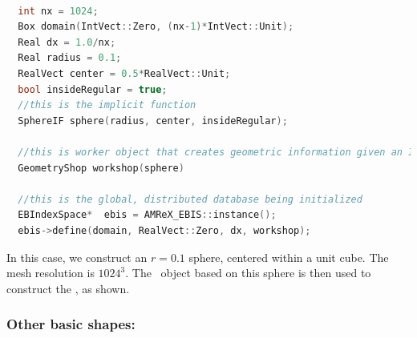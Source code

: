 \begin{lstlisting}[language=cpp]

  int nx = 1024;
  Box domain(IntVect::Zero, (nx-1)*IntVect::Unit);
  Real dx = 1.0/nx;
  Real radius = 0.1;
  RealVect center = 0.5*RealVect::Unit;
  bool insideRegular = true;
  //this is the implicit function
  SphereIF sphere(radius, center, insideRegular);

  //this is worker object that creates geometric information given an IF
  GeometryShop workshop(sphere)

  //this is the global, distributed database being initialized
  EBIndexSpace*  ebis = AMReX_EBIS::instance();
  ebis->define(domain, RealVect::Zero, dx, workshop);

\end{lstlisting}

In this case, we construct an $r=0.1$ sphere, centered within a unit cube.  The mesh resolution is $1024^3$.
The \geom\ object based on this sphere is then used to construct the \ebis, as shown.

\subsubsection{Other basic shapes:}

